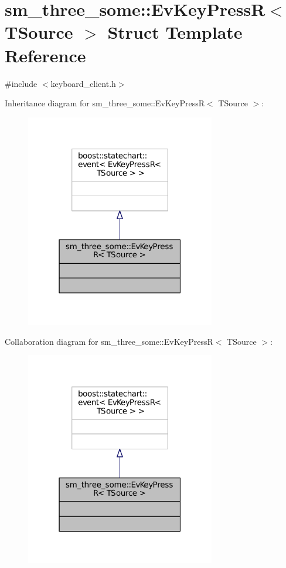 \hypertarget{structsm__three__some_1_1EvKeyPressR}{}\section{sm\+\_\+three\+\_\+some\+:\+:Ev\+Key\+PressR$<$ T\+Source $>$ Struct Template Reference}
\label{structsm__three__some_1_1EvKeyPressR}


{\ttfamily \#include $<$keyboard\+\_\+client.\+h$>$}



Inheritance diagram for sm\+\_\+three\+\_\+some\+:\+:Ev\+Key\+PressR$<$ T\+Source $>$\+:
\nopagebreak
\begin{figure}[H]
\begin{center}
\leavevmode
\includegraphics[width=235pt]{structsm__three__some_1_1EvKeyPressR__inherit__graph}
\end{center}
\end{figure}


Collaboration diagram for sm\+\_\+three\+\_\+some\+:\+:Ev\+Key\+PressR$<$ T\+Source $>$\+:
\nopagebreak
\begin{figure}[H]
\begin{center}
\leavevmode
\includegraphics[width=235pt]{structsm__three__some_1_1EvKeyPressR__coll__graph}
\end{center}
\end{figure}


